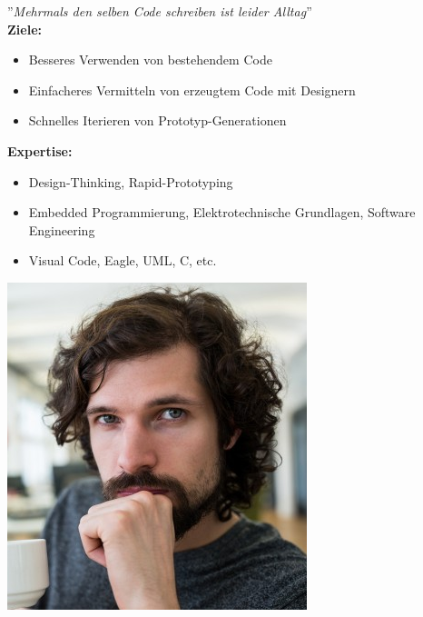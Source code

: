 \begin{tcolorbox}[title={Mark, 28, Creative Technologist},toptitle=3mm,bottomtitle=3mm, bicolor ,sidebyside,righthand width=3cm, sharp corners, boxrule=.4pt, colback=green!5, colbacklower=green!5]
    ''\textit{Mehrmals den selben Code schreiben ist leider Alltag}''
    \\
    \textbf{Ziele:} 
    \begin{itemize}
        \item Besseres Verwenden von bestehendem Code
        \item Einfacheres Vermitteln von erzeugtem Code mit Designern
        \item Schnelles Iterieren von Prototyp-Generationen
    \end{itemize}
    \textbf{Expertise:} 
    \begin{itemize}
        \item Design-Thinking, Rapid-Prototyping
        \item Embedded Programmierung, Elektrotechnische Grundlagen, Software Engineering
        \item Visual Code, Eagle, UML, C, etc.
    \end{itemize}
    \tcblower
    \includegraphics[width=\linewidth]{bilder/chapter3/mark.png}
\end{tcolorbox}

